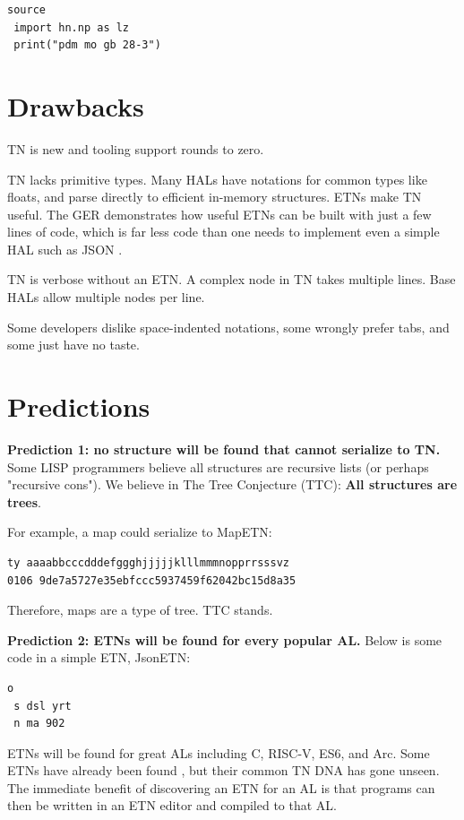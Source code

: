 \documentclass[journal]{IEEEtran}
\begin{document}
\begin{lstlisting}
source
 import hn.np as lz
 print("pdm mo gb 28-3")
\end{lstlisting}

\section{Drawbacks}

TN is new and tooling support rounds to zero.

TN lacks primitive types. Many HALs have notations for common types like floats, and parse directly to efficient in-memory structures. ETNs make TN useful. The GER demonstrates how useful ETNs can be built with just a few lines of code, which is far less code than one needs to implement even a simple HAL such as JSON \cite{Ooms}.

TN is verbose without an ETN. A complex node in TN takes multiple lines. Base HALs allow multiple nodes per line.

Some developers dislike space-indented notations, some wrongly prefer tabs, and some just have no taste.

\section{Predictions}

\textbf{Prediction 1: no structure will be found that cannot serialize to TN.} Some LISP programmers believe all structures are recursive lists (or perhaps "recursive cons"). We believe in The Tree Conjecture (TTC): \textbf{All structures are trees}.

For example, a map could serialize to MapETN:

\begin{lstlisting}
ty aaaabbcccdddefggghjjjjjklllmmmnopprrsssvz
0106 9de7a5727e35ebfccc5937459f62042bc15d8a35
\end{lstlisting}

Therefore, maps are a type of tree. TTC stands.

\textbf{Prediction 2: ETNs will be found for every popular AL.} Below is some code in a simple ETN, JsonETN:

\begin{lstlisting}
o
 s dsl yrt
 n ma 902
\end{lstlisting}

ETNs will be found for great ALs including C, RISC-V, ES6, and Arc. Some ETNs have already been found \cite{Roughan}, but their common TN DNA has gone unseen. The immediate benefit of discovering an ETN for an AL is that programs can then be written in an ETN editor and compiled to that AL.
\end{document}
